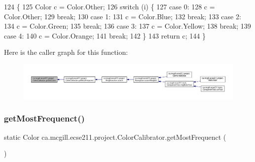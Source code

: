 \begin{DoxyCode}
124                                          \{
125     Color c = Color.Other;
126     \textcolor{keywordflow}{switch} (i) \{
127       \textcolor{keywordflow}{case} 0:
128         c = Color.Other;
129         \textcolor{keywordflow}{break};
130       \textcolor{keywordflow}{case} 1: 
131         c = Color.Blue;
132         \textcolor{keywordflow}{break};
133       \textcolor{keywordflow}{case} 2:
134         c = Color.Green;
135         \textcolor{keywordflow}{break};
136       \textcolor{keywordflow}{case} 3:
137         c = Color.Yellow;
138         \textcolor{keywordflow}{break};
139       \textcolor{keywordflow}{case} 4:
140         c = Color.Orange;
141         \textcolor{keywordflow}{break};
142     \}
143     \textcolor{keywordflow}{return} c;
144   \}
\end{DoxyCode}
Here is the caller graph for this function\+:
\nopagebreak
\begin{figure}[H]
\begin{center}
\leavevmode
\includegraphics[width=350pt]{classca_1_1mcgill_1_1ecse211_1_1project_1_1_color_calibrator_acb1d9cef0739971dbe00cc16712be0fe_icgraph}
\end{center}
\end{figure}
\mbox{\label{classca_1_1mcgill_1_1ecse211_1_1project_1_1_color_calibrator_a3d65927aaa2041f933dbdc19c3d2a412}} 
\subsubsection{\texorpdfstring{get\+Most\+Frequenct()}{getMostFrequenct()}}
{\footnotesize\ttfamily static Color ca.\+mcgill.\+ecse211.\+project.\+Color\+Calibrator.\+get\+Most\+Frequenct (\begin{DoxyParamCaption}{ }\end{DoxyParamCaption})\hspace{0.3cm}{\ttfamily [static]}}

